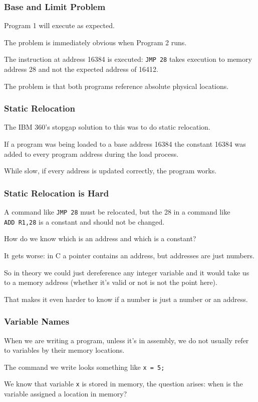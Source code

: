 \begin{frame}
\frametitle{Base and Limit Problem}

Program 1 will execute as expected. 

The problem is immediately obvious when Program 2 runs. 

The instruction at address 16384 is executed: \texttt{JMP 28} takes execution to memory address 28 and not the expected address of 16412. 

The problem is that both programs reference absolute physical locations. 

\end{frame}

\begin{frame}
\frametitle{Static Relocation}

The IBM 360's stopgap solution to this was to do static relocation.

If a program was being loaded to a base address 16384 the constant 16384 was added to every program address during the load process. 

While slow, if every address is updated correctly, the program works.



\end{frame}

\begin{frame}
\frametitle{Static Relocation is Hard}

A command like \texttt{JMP 28} must be relocated, but the 28 in a command like \texttt{ADD~R1,28} is a constant and should not be changed. 

How do we know which is an address and which is a constant? 

It gets worse: in C a pointer contains an address, but addresses are just numbers. 

So in theory we could just dereference any integer variable and it would take us to a memory address (whether it's valid or not is not the point here). 

That makes it even harder to know if a number is just a number or an address.


\end{frame}

\begin{frame}
\frametitle{Variable Names}

When we are writing a program, unless it's in assembly, we do not usually refer to variables by their memory locations.

The command we write looks something like \texttt{x = 5;} 

We know that variable \texttt{x} is stored in memory, the question arises: when is the variable assigned a location in memory?


\end{frame}

